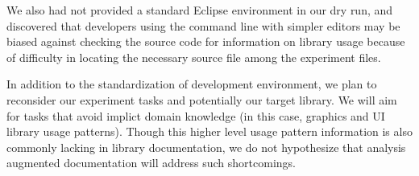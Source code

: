 We also had not provided a standard Eclipse environment in our dry run, and
discovered that developers using the command line with simpler editors may be biased against
checking the source code for information on library usage because of difficulty
in locating the necessary source file among the experiment files.

In addition to the standardization of development environment, we plan to
reconsider our experiment tasks and potentially our target library. We will aim
for tasks that avoid implict domain knowledge (in this case, graphics and UI
library usage patterns). Though this higher level usage pattern information is
also commonly lacking in library documentation, we do not hypothesize that
analysis augmented documentation will address such shortcomings.
